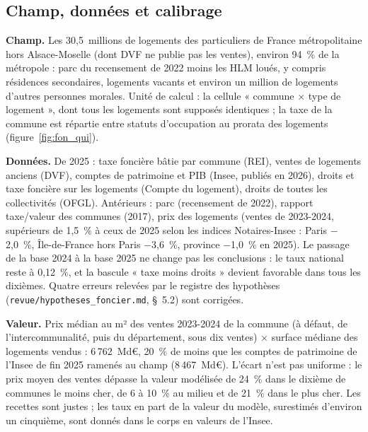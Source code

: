 
\subsection{Champ, données et calibrage}

\textbf{Champ.} Les 30,5~millions de logements des particuliers de France métropolitaine hors Alsace-Moselle (dont DVF
ne publie pas les ventes), environ 94~\% de la métropole : parc du recensement de 2022 moins les HLM loués, y compris
résidences secondaires, logements vacants et environ un million de logements d'autres personnes morales. Unité de calcul :
la cellule « commune × type de logement », dont tous les logements sont supposés identiques ; la taxe de la commune est
répartie entre statuts d'occupation au prorata des logements (figure~\ref{fig:fon_qui}).

\textbf{Données.} De 2025 : taxe foncière bâtie par commune (REI), ventes de logements anciens (DVF), comptes de
patrimoine et PIB (Insee, publiés en 2026), droits et taxe foncière sur les logements (Compte du logement), droits de
toutes les collectivités (OFGL). Antérieurs : parc (recensement de 2022), rapport taxe/valeur des communes (2017), prix
des logements (ventes de 2023-2024, supérieurs de 1,5~\% à ceux de 2025 selon les indices Notaires-Insee : Paris
$-$2,0~\%, Île-de-France hors Paris $-$3,6~\%, province $-$1,0~\% en 2025). Le passage de la base 2024 à la base 2025 ne
change pas les conclusions : le taux national reste à 0,12~\%, et la bascule « taxe moins droits » devient favorable dans
tous les dixièmes. Quatre erreurs relevées par le registre des hypothèses (\texttt{revue/hypotheses\_foncier.md},
§~5.2) sont corrigées.

\textbf{Valeur.} Prix médian au m² des ventes 2023-2024 de la commune (à défaut, de l'intercommunalité, puis du
département, sous dix ventes) × surface médiane des logements vendus : 6\,762~Md€, 20~\% de moins que les comptes de
patrimoine de l'Insee de fin 2025 ramenés au champ (8\,467~Md€). L'écart n'est pas uniforme : le prix moyen des ventes
dépasse la valeur modélisée de 24~\% dans le dixième de communes le moins cher, de 6 à 10~\% au milieu et de 21~\% dans le
plus cher. Les recettes sont justes ; les taux en part de la valeur du modèle, surestimés d'environ un cinquième, sont
donnés dans le corps en valeurs de l'Insee.

